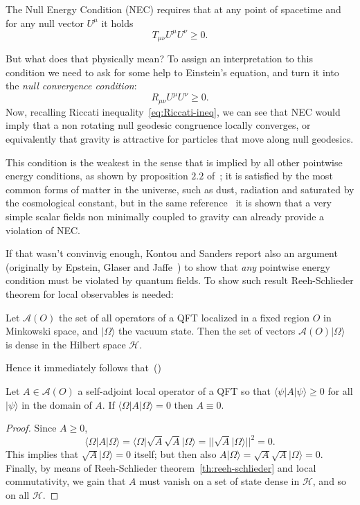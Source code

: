 \begin{definition}
    \label{def:NEC}
    The Null Energy Condition (NEC) requires that at any point of spacetime and for any null vector \(U^{\mu}\) it holds
    \[
    T_{\mu\nu}U^{\mu}U^{\nu} \ge 0.
    \]
\end{definition}

But what does that physically mean? To assign an interpretation to this condition we need to ask for some help to Einstein's equation, and turn it into the \emph{null convergence condition}:
\[
    R_{\mu\nu}U^{\mu}U^{\nu} \ge 0. 
\]
Now, recalling Riccati inequality~\eqref{eq:Riccati-ineq}, we can see that NEC would imply that a non rotating null geodesic congruence locally converges, or equivalently that gravity is attractive for particles that move along null geodesics.

This condition is the weakest in the sense that is implied by all other pointwise energy conditions, as shown by proposition \(2.2\) of~\cite{kontou2020energy}; it is satisfied by the most common forms of matter in the universe, such as dust, radiation and saturated by the cosmological constant, but in the same reference~\cite{kontou2020energy} it is shown that a very simple scalar fields non minimally coupled to gravity can already provide a violation of NEC.

If that wasn't convinvig enough, Kontou and Sanders report also an argument (originally by Epstein, Glaser and Jaffe~\cite{epstein1965nonpositivity}) to show that \emph{any} pointwise energy condition must be violated by quantum fields. To show such result Reeh-Schlieder theorem for local observables is needed:
\begin{theorem}
    \label{th:reeh-schlieder}
    Let \(\mathcal{A}(O)\) the set of all operators of a QFT localized in a fixed region \(O\) in Minkowski space, and \(\vert \Omega \rangle\) the vacuum state. Then the set of vectors \(\mathcal{A}(O)\vert \Omega \rangle\) is dense in the Hilbert space \(\mathcal{H}\).
\end{theorem}

Hence it immediately follows that~(\cite{epstein1965nonpositivity})
\begin{theorem}
    \label{th:quantum-violation-pointwise-conditions}
    Let \(A\in \mathcal{A}(O)\) a self-adjoint local operator of a QFT so that \(\langle \psi\vert A\vert\psi\rangle\ge 0\) for all \(\vert\psi\rangle\) in the domain of \(A\). If \(\langle \Omega\vert A\vert\Omega\rangle = 0\) then \(A \equiv 0\).
\end{theorem}
\begin{proof}
    Since \(A\ge 0\), 
    \[
        \langle \Omega\vert A\vert\Omega\rangle = \langle \Omega\vert \sqrt{A}\sqrt{A}\vert\Omega\rangle = \vert\vert \sqrt{A}\vert\Omega\rangle\vert\vert^2 = 0.
    \] 
    This implies that \(\sqrt{A}\vert\Omega\rangle = 0\) itself; but then also \(A\vert\Omega\rangle = \sqrt{A}\sqrt{A}\vert\Omega\rangle = 0\). Finally, by means of Reeh-Schlieder theorem~\ref{th:reeh-schlieder} and local commutativity, we gain that \(A\) must vanish on a set of state dense in \(\mathcal{H}\), and so on all \(\mathcal{H}\).
\end{proof}


